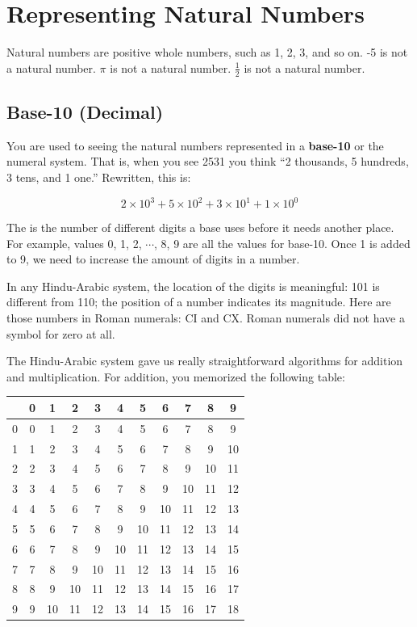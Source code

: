 \section{Representing Natural Numbers}\label{chap:hexbinary}
Natural numbers are positive whole numbers, such as 1, 2, 3, and so on. -5 is not a natural
number. $\pi$ is not a natural number. $\frac{1}{2}$ is not a natural
number.

\subsection{Base-10 (Decimal)}
You are used to seeing the natural numbers represented in a \textbf{base-10}
 or the  numeral system. That is, when you see 2531 you
think ``2 thousands, 5 hundreds, 3 tens, and 1 one.'' Rewritten, this is:

$$2 \times 10^3 + 5 \times 10^2 + 3 \times 10^1 + 1 \times 10^0$$

The  is the number of different digits a base uses before it needs another place. 
For example, values 0, 1, 2, $\cdots$, 8, 9 are all the values for base-10. 
Once 1 is added to 9, we need to increase the amount of digits in a number. 

In any Hindu-Arabic system, the location of the digits is meaningful:
101 is different from 110; the position of a number indicates its magnitude. Here are those numbers in Roman numerals:
CI and CX. Roman numerals did not have a symbol for zero at all.

The Hindu-Arabic system gave us really straightforward algorithms for
addition and multiplication. For addition, you memorized the following table:

\begin{tabular}{ c || c | c | c | c | c | c| c| c| c| c }
 & 0 & 1 & 2 & 3 & 4 & 5 & 6 & 7 & 8 & 9 \\
 \hline
0 & 0 & 1 & 2 & 3 & 4 & 5 & 6 & 7 & 8 & 9 \\
1 & 1 & 2 & 3 & 4 & 5 & 6 & 7 & 8 & 9 & 10 \\
2 & 2 & 3 & 4 & 5 & 6 & 7 & 8 & 9 & 10 & 11\\
3 & 3 & 4 & 5 & 6 & 7 & 8 & 9 & 10 & 11 & 12\\
4 & 4 & 5 & 6 & 7 & 8 & 9 & 10 & 11 & 12 & 13\\
5 & 5 & 6 & 7 & 8 & 9 & 10 & 11 & 12 & 13 & 14\\
6 & 6 & 7 & 8 & 9 & 10 & 11 & 12 & 13 & 14 & 15\\
7 & 7 & 8 & 9 & 10 & 11 & 12 & 13 & 14 & 15 & 16\\
8 & 8 & 9 & 10 & 11 & 12 & 13 & 14 & 15 & 16 & 17\\
9 & 9 & 10 & 11 & 12 & 13 & 14 & 15 & 16 & 17 & 18\\
\end{tabular}

